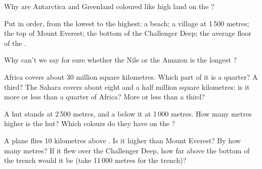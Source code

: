 \begin{exercise}[$\star$]\label{exo:g4:world-physical-map:6}
Why are Antarctica and Greenland coloured like high land on the ?
\end{exercise}

\begin{exercise}[$\star\star$]\label{exo:g4:world-physical-map:7}
Put in order, from the lowest to the highest: a beach; a village at
1\,500 metres; the top of Mount Everest; the bottom of the Challenger
Deep; the average floor of the .
\end{exercise}

\begin{exercise}[$\star\star$]\label{exo:g4:world-physical-map:8}
Why can't we say for sure whether the Nile or the Amazon is the longest
?
\end{exercise}

\begin{exercise}[$\star\star$]\label{exo:g4:world-physical-map:9}
Africa covers about 30 million square kilometres. Which part of it is a
quarter? A third? The Sahara covers about eight and a half million square
kilometres: is it more or less than a quarter of Africa? More or less than
a third?
\end{exercise}

\begin{exercise}[$\star\star$]\label{exo:g4:world-physical-map:10}
A  hut stands at 2\,500 metres, and a  below it at 1\,000
metres. How many metres higher is the hut? Which colours do they have on
the ?
\end{exercise}

\begin{exercise}[$\star\star\star$]\label{exo:g4:world-physical-map:11}
A plane flies 10 kilometres above . Is it higher than Mount
Everest? By how many metres? If it flew over the Challenger Deep, how far
above the bottom of the trench would it be (take 11\,000 metres for the
trench)?
\end{exercise}

